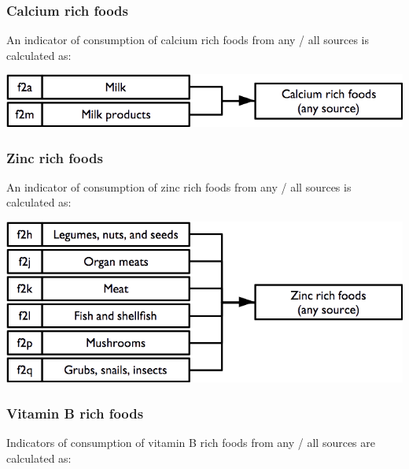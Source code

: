 \documentclass[12pt,a4paper]{book}
\theoremstyle{definition}
\theoremstyle{definition}
\theoremstyle{definition}
\theoremstyle{remark}
\begin{document}
\hypertarget{calcium-rich-foods}{%
\subsubsection{Calcium rich foods}\label{calcium-rich-foods}}

An indicator of consumption of calcium rich foods from any / all sources
is calculated as:

\begin{center}\includegraphics[width=9.76in]{figures/indicators12} \end{center}

\hypertarget{zinc-rich-foods}{%
\subsubsection{Zinc rich foods}\label{zinc-rich-foods}}

An indicator of consumption of zinc rich foods from any / all sources is
calculated as:

\begin{center}\includegraphics[width=9.76in]{figures/indicators13} \end{center}

\newpage

\hypertarget{vitamin-b-rich-foods}{%
\subsubsection{Vitamin B rich foods}\label{vitamin-b-rich-foods}}

Indicators of consumption of vitamin B rich foods from any / all sources
are calculated as:
\end{document}
